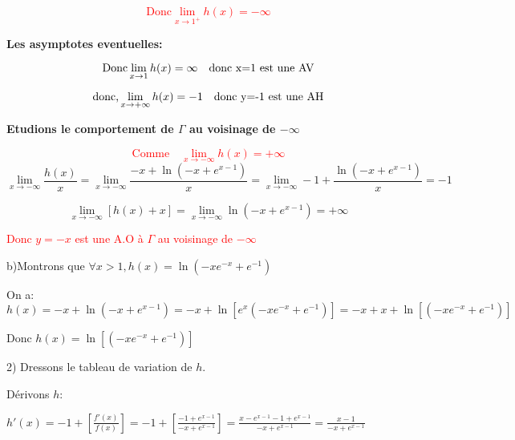 \documentclass[12pt]{article}
\begin{document}
\textcolor{red}{\[\text{Donc}\lim_{x \to 1^{+}}h(x)=-\infty\]}

\textbf{Les  asymptotes eventuelles:}

\textcolor{red}{\[\text{Donc}\lim_{x \to 1 }h(x)=\infty\text{\quad donc x=1 est une AV}\]}

\textcolor{red}{\[\text{donc,}\lim_{x \to +\infty}h(x)=-1\text{\quad donc y=-1 est une AH}\]}

\textbf{Etudions le comportement de  $\Gamma$ au voisinage de $-\infty$}

\textcolor{red}{\[\text{Comme}\quad \lim_{x \to -\infty}h(x)=+\infty\]}
\[\lim_{x \to -\infty}\frac{h(x)}{x}=\lim_{x \to -\infty}\frac{-x+\ln(-x+e^{x-1})}{x}=\lim_{x \to -\infty}-1+\frac{\ln(-x+e^{x-1})}{x}=-1\]

\[\lim_{x \to -\infty}\left[ h(x)+x\right] =\lim_{x \to -\infty}\ln(-x+e^{x-1})=+\infty\]

\textcolor{red}{Donc $y=-x$ est une A.O à $\Gamma$ au voisinage de $-\infty$}

b)Montrons que $\forall x>1, h(x)=\ln(-xe^{-x}+e^{-1}) $ 

On a: $h(x)=-x+\ln(-x+e^{x-1})=-x+\ln\left[e^{x}(-xe^{-x}+e^{-1})\right]=-x+x+\ln\left[(-xe^{-x}+e^{-1})\right]$

Donc $h(x)=\ln\left[(-xe^{-x}+e^{-1})\right]$




2) Dressons le tableau de variation de  $h$. 

Dérivons $h$:

$h'(x)=-1+\left[\frac{f'(x)}{f(x)}\right]=-1+\left[\frac{-1+e^{x-1}}{-x+e^{x-1}}\right]=\frac{x-e^{x-1}-1+e^{x-1}}{-x+e^{x-1}}=\frac{x-1}{-x+e^{x-1}}$
\end{document}
